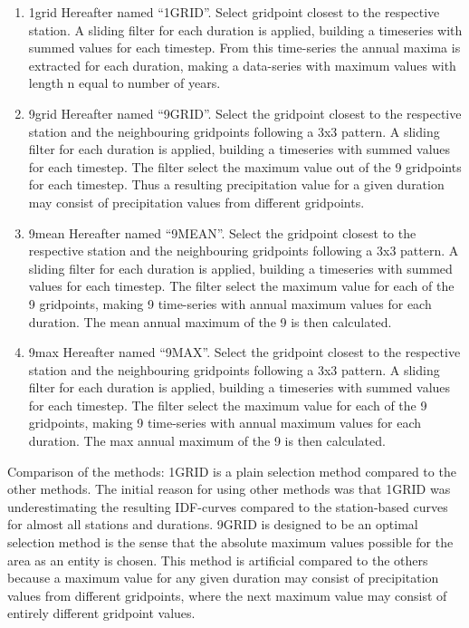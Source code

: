 \begin{enumerate}

\item 1grid 
Hereafter named “1GRID”. Select gridpoint closest to the respective station. A sliding filter for each duration is applied, building a timeseries with summed values for each timestep. From this time-series the annual maxima is extracted for each duration, making a data-series with maximum values with length n equal to number of years. 

\item 9grid
Hereafter named “9GRID”. Select the gridpoint closest to the respective station and the neighbouring gridpoints following a 3x3 pattern. A sliding filter for each duration is applied, building a timeseries with summed values for each timestep. The filter select the maximum value out of the 9 gridpoints for each timestep. Thus a resulting precipitation value for a given duration may consist of precipitation values from different gridpoints. 

\item 9mean
Hereafter named “9MEAN”. Select the gridpoint closest to the respective station and the neighbouring gridpoints following a 3x3 pattern. A sliding filter for each duration is applied, building a timeseries with summed values for each timestep. The filter select the maximum value for each of the 9 gridpoints, making 9 time-series with annual maximum values for each duration. The mean annual maximum of the 9 is then calculated. 

\item 9max
Hereafter named “9MAX”. Select the gridpoint closest to the respective station and the neighbouring gridpoints following a 3x3 pattern. A sliding filter for each duration is applied, building a timeseries with summed values for each timestep. The filter select the maximum value for each of the 9 gridpoints, making 9 time-series with annual maximum values for each duration. The max annual maximum of the 9 is then calculated.

\end{enumerate}

Comparison of the methods: 
1GRID is a plain selection method compared to the other methods. The initial reason for using other methods was that 1GRID was underestimating the resulting IDF-curves compared to the station-based curves for almost all stations and durations. 9GRID is designed to be an optimal selection method is the sense that the absolute maximum values possible for the area as an entity is chosen. This method is artificial compared to the others because a maximum value for any given duration may consist of precipitation values from different gridpoints, where the next maximum value may consist of entirely different gridpoint values.    

